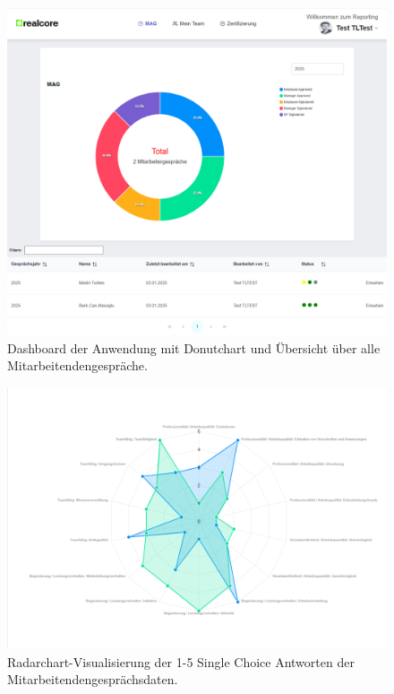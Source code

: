 \begin{figure}[H] \centering \includegraphics[width=\textwidth]{images/donutchart.png} \caption{Dashboard der Anwendung mit Donutchart und Übersicht über alle Mitarbeitendengespräche.} \label{fig:dashboard} \end{figure}

\begin{figure}[H] \centering \includegraphics[angle=90, width=\textwidth]{images/radarchart_prod.png} \caption{Radarchart-Visualisierung der 1-5 Single Choice Antworten der Mitarbeitendengesprächsdaten.} \label{fig:radar_chart} \end{figure}

